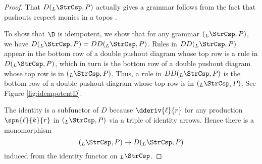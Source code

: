 \begin{proof}
  That $ D ( _{L}\StrCsp , P ) $ actually gives a grammar
  follows from the fact that pushouts respect monics in a
  topos \cite[Lem.~12]{lack-sobo_adhesive-cats}.
  
  To show that $ \D $ is idempotent, we show that for any
  grammar $ ( _{L}\StrCsp , P ) $, we have
  $ D ( _{L}\StrCsp , P ) = DD ( _{L}\StrCsp , P ) $.  Rules
  in $ DD ( _{L}\StrCsp , P ) $ appear in the bottom row of a
  double pushout diagram whose top row is a rule in
  $ D ( _{L}\StrCsp , P ) $, which in turn is the bottom row
  of a double pushout diagram whose top row is in
  $ ( _{L}\StrCsp , P ) $. Thus, a rule in
  $ DD ( _{L}\StrCsp , P ) $ is the bottom row of a double
  pushout diagram whose top row is in
  $ ( _{L}\StrCsp , P ) $. See Figure \ref{fig:idempotentD}.

  \begin{figure}[h]
    \centering
\end{figure}

    The identity is a subfunctor of $ D $ because
    $ \dderiv{\ell}{r} $ for any production
    $ \spn{\ell}{k}{r} $ in $ ( _{L}\StrCsp , P ) $ via a
    triple of identity arrows. Hence there is a monomorphism
    \[
      ( _L \StrCsp , P ) \to
      D ( _L \StrCsp , P )
    \]
    induced from the identity functor on $ _L\StrCsp $.
\end{proof}

